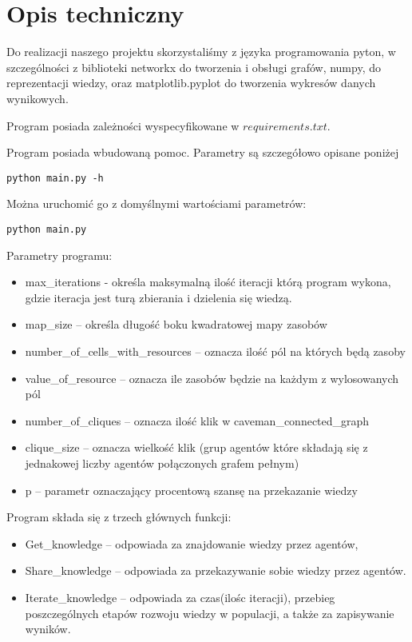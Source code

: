 \section{Opis techniczny}

Do realizacji naszego projektu skorzystaliśmy z języka programowania pyton, w szczególności z biblioteki networkx do tworzenia i obsługi grafów, numpy, do reprezentacji wiedzy, oraz matplotlib.pyplot do tworzenia wykresów danych wynikowych.

Program posiada zależności wyspecyfikowane w $requirements.txt$.

Program posiada wbudowaną pomoc. Parametry są szczegółowo opisane poniżej
\begin{lstlisting}
python main.py -h
\end{lstlisting}

\newpage
Można uruchomić go z domyślnymi wartościami parametrów:
\begin{lstlisting}
python main.py
\end{lstlisting}

Parametry programu:

\begin{itemize}

\item  max\_iterations - określa maksymalną ilość iteracji którą program wykona, gdzie iteracja jest turą zbierania i dzielenia się wiedzą.
\item  map\_size – określa długość boku kwadratowej mapy zasobów
\item  number\_of\_cells\_with\_resources – oznacza ilość pól na których będą zasoby
\item  value\_of\_resource – oznacza ile zasobów będzie na każdym z wylosowanych pól
\item  number\_of\_cliques – oznacza ilość klik w caveman\_connected\_graph
\item  clique\_size – oznacza wielkość klik (grup agentów które składają się z jednakowej liczby agentów połączonych grafem pełnym)
\item  p – parametr oznaczający procentową szansę na przekazanie wiedzy

\end{itemize}

Program składa się z trzech głównych funkcji:

\begin{itemize}

\item Get\_knowledge – odpowiada za znajdowanie wiedzy przez agentów,
\item Share\_knowledge – odpowiada za przekazywanie sobie wiedzy przez agentów.
\item Iterate\_knowledge – odpowiada za czas(ilośc iteracji), przebieg poszczególnych etapów rozwoju wiedzy w populacji, a także za zapisywanie wyników.

\end{itemize}
